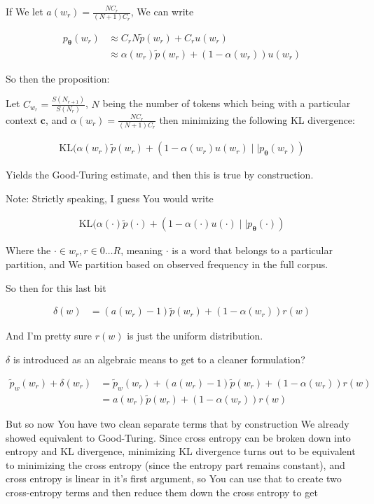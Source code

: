 \documentclass{article}
\newcommand{\KL}{\mathrm{KL}}
\newcommand{\vtheta}{\boldsymbol{\theta}}
\newcommand{\model}{p_{\vtheta}}
\newcommand{\context}{\boldsymbol{c}}
\begin{document}
		If We let $a(w_r) = \frac{NC_r}{(N+1)C_r}$, We can write
		
		\begin{align}
			\model(w_r) &\approx C_r N\tilde{p}(w_r) + C_r u(w_r)\\
			&\approx \alpha(w_r)\tilde{p}(w_r) + (1-\alpha(w_r)) u(w_r)
		\end{align}
		
		So then the proposition:
		
		Let $C_{w_r} = \frac{S(N_{r+1})}{S(N_r)}$, $N$ being the number of tokens which being with a particular context $\context$, and $\alpha(w_r) = \frac{NC_r}{(N+1)C_r}$ then minimizing the following KL divergence:
		
		\begin{align}
			\KL(\alpha(w_r)\tilde{p}(w_r) + (1-\alpha(w_r)u(w_r)\mid\mid \model(w_r))
		\end{align}
		
		Yields the Good-Turing estimate, and then this is true by construction.
		
		Note: Strictly speaking, I guess You would write
		
		\begin{align}
			\KL(\alpha(\cdot)\tilde{p}(\cdot) + (1-\alpha(\cdot)u(\cdot)\mid\mid \model(\cdot))
		\end{align}	
	
		Where the $\cdot\in w_r, r\in{0\ldots R}$, meaning $\cdot$ is a word that belongs to a particular partition, and We partition based on observed frequency in the full corpus.
		
		So then for this last bit
		
		\begin{align}
			\delta(w) &= (a(w_r) - 1)\tilde{p}(w_r) + (1-\alpha(w_r)) r(w)
		\end{align}
		
		And I'm pretty sure $r(w)$ is just the uniform distribution. 
		
		$\delta$ is introduced as an algebraic means to get to a cleaner formulation?
		
		\begin{align}
			\tilde{p}_w (w_r) + \delta(w_r) &= \tilde{p}_w (w_r) + (a(w_r) - 1)\tilde{p}(w_r) + (1-\alpha(w_r)) r(w)\\
			&= a(w_r)\tilde{p}(w_r) + (1-\alpha(w_r)) r(w)
		\end{align}
		
		But so now You have two clean separate terms that by construction We already showed equivalent to Good-Turing. Since cross entropy can be broken down into entropy and KL divergence, minimizing KL divergence turns out to be equivalent to minimizing the cross entropy (since the entropy part remains constant), and cross entropy is linear in it's first argument, so You can use that to create two cross-entropy terms and then reduce them down the cross entropy to get
		
\end{document}
